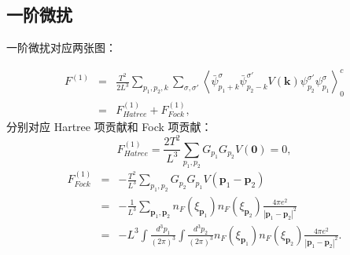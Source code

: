 \documentclass[10pt,UTF8]{ctexart}
\begin{document}
\subsection*{一阶微扰}
\noindent
一阶微扰对应两张图：

\begin{figure}[H]
\centering{}%
\begin{minipage}[t]{0.45\columnwidth}%
%
\end{minipage}%
\begin{minipage}[t]{0.45\columnwidth}%
%
\end{minipage}
\end{figure}
\begin{eqnarray}
	F^{\left(1\right)} & = & \frac{T^{2}}{2L^{3}}\sum_{p_{1},p_{2},k}\sum_{\sigma,\sigma'}\left\langle \bar{\psi}_{p_{1}+k}^{\sigma}\bar{\psi}_{p_{2}-k}^{\sigma'}V\left(\bm{k}\right)\psi_{p_{2}}^{\sigma'}\psi_{p_{1}}^{\sigma}\right\rangle _{0}^{c}\\
 	& = & F_{Hatree}^{\left(1\right)}+F_{Fock}^{\left(1\right)},
\end{eqnarray}
分别对应 Hartree 项贡献和 Fock 项贡献：
\begin{equation}
	F_{Hatree}^{\left(1\right)} = \frac{2T^{2}}{L^{3}}\sum_{p_{1},p_{2}}G_{p_{1}}G_{p_{2}} V\left(\bm{0}\right) = 0,
\end{equation}
\begin{eqnarray}
	F_{Fock}^{\left(1\right)} & = & -\frac{T^{2}}{L^{3}}\sum_{p_{1},p_{2}}G_{p_{2}} G_{p_{1}} V\left(\bm{p}_{1}-\bm{p}_{2}\right)\\
 	& = & -\frac{1}{L^{3}}\sum_{\bm{p}_{1},\bm{p}_{2}} n_{F}\left(\xi_{\bm p_1}\right)n_{F}\left(\xi_{\bm p_2}\right)\frac{4\pi e^{2}}{\left|\bm{p}_{1}-\bm{p}_{2}\right|^{2}}\\
 	& = & -L^{3}\int\frac{d^{3}p_{1}}{\left(2\pi\right)^{3}}\int\frac{d^{3}p_{2}}{\left(2\pi\right)^{3}}n_{F}\left(\xi_{\bm p_1}\right)n_{F}\left(\xi_{\bm p_2}\right) \frac{4\pi e^{2}}{\left|\bm{p}_{1}-\bm{p}_{2}\right|^{2}}.
\end{eqnarray}
\end{document}

